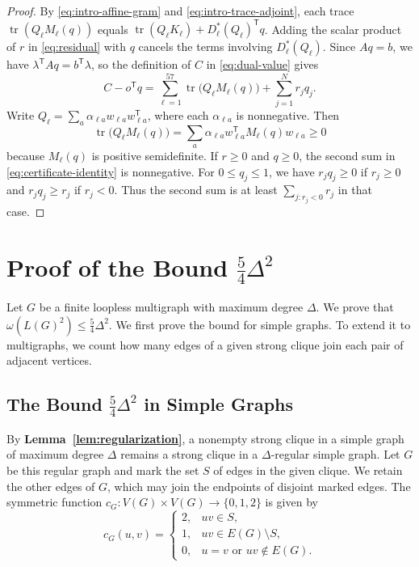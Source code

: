 \documentclass[preprint,11pt,numbers]{elsarticle-arxiv}
\numberwithin{equation}{section}
\theoremstyle{definition}
\DeclareMathOperator{\tr}{tr}
\begin{document}
\begin{proof}
By \eqref{eq:intro-affine-gram} and
\eqref{eq:intro-trace-adjoint}, each trace
$\tr(Q_\ell M_\ell(q))$ equals
$\tr(Q_\ell K_\ell)+D_\ell^*(Q_\ell)^{\mathsf T}q$.
Adding the scalar product of $r$ in \eqref{eq:residual} with $q$
cancels the terms involving $D_\ell^*(Q_\ell)$. Since $Aq=b$,
we have $\lambda^{\mathsf T}Aq=b^{\mathsf T}\lambda$, so
the definition of $C$ in \eqref{eq:dual-value} gives
\begin{equation}\label{eq:certificate-identity}
 C-o^{\mathsf T}q
 =\sum_{\ell=1}^{57}\tr\bigl(Q_\ell M_\ell(q)\bigr)
  +\sum_{j=1}^N r_jq_j.
\end{equation}
Write $Q_\ell=\sum_a\alpha_{\ell a}w_{\ell a}w_{\ell a}^{\mathsf T}$,
where each $\alpha_{\ell a}$ is nonnegative. Then
\[
 \tr\bigl(Q_\ell M_\ell(q)\bigr)=
 \sum_a\alpha_{\ell a}w_{\ell a}^{\mathsf T}M_\ell(q)w_{\ell a}\geq0
\]
because $M_\ell(q)$ is positive semidefinite. If $r\geq0$ and $q\geq0$,
the second sum in \eqref{eq:certificate-identity} is nonnegative.
For $0\leq q_j\leq1$, we have $r_jq_j\geq0$ if $r_j\geq0$ and
$r_jq_j\geq r_j$ if $r_j<0$. Thus the second sum is at least
$\sum_{j:r_j<0}r_j$ in that case.
\end{proof}
\section{Proof of the Bound \texorpdfstring{$\frac{5}{4}\Delta^2$}{5 Delta squared / 4}}\label{sec:uniform}

Let $G$ be a finite loopless multigraph with maximum degree $\Delta$.
We prove that $\omega(L(G)^2)\leq\frac{5}{4}\Delta^2$. We first
prove the bound for simple graphs. To extend it to multigraphs, we
count how many edges of a given strong clique join each pair of
adjacent vertices.

\subsection{The Bound \texorpdfstring{$\frac{5}{4}\Delta^2$}{5 Delta squared / 4} in Simple Graphs}
\label{sec:simple-proof}\label{sec:finite-model}\label{sec:identities}\label{sec:finite-instance}
\label{subsubsec:conditional-extension-counts}

By \textbf{Lemma~\ref{lem:regularization}}, a nonempty strong clique
in a simple graph of maximum degree $\Delta$ remains a strong clique
in a $\Delta$-regular simple graph. Let $G$ be this regular graph and
mark the set $S$ of edges in the given clique. We retain the other
edges of $G$, which may join the endpoints of disjoint marked edges.
The symmetric function
$c_G\colon V(G)\times V(G)\to\{0,1,2\}$ is given by
\[
 c_G(u,v)=
 \begin{cases}
  2,&uv\in S,\\
  1,&uv\in E(G)\setminus S,\\
  0,&u=v\text{ or }uv\notin E(G).
 \end{cases}
\]
\end{document}
